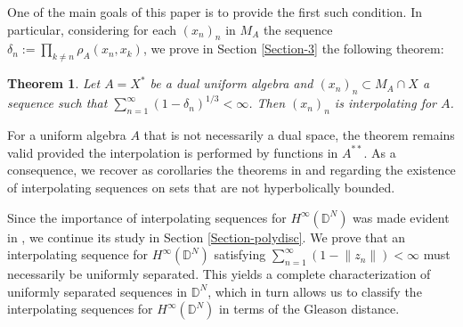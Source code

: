 \documentclass[preprint,12pt,number]{elsarticle}
\newtheorem{theorem}{Theorem}[section]
\begin{document}
One of the main goals of this paper is to provide the first such condition. In particular, considering for each $(x_n)_n$ in $M_A$ the sequence $\delta_n:=\prod_{k\neq n}\rho_A(x_n,x_k)$, we prove in Section \ref{Section-3} the following theorem:

\begin{theorem}\label{Main Theorem}Let $A=X^*$ be a dual uniform algebra and $(x_n)_n\subset M_A\cap X$ a sequence such that $\sum_{n=1}^\infty(1-\delta_n)^{1/3}<\infty$. Then $(x_n)_n$ is interpolating for $A$.\end{theorem}For a uniform algebra $A$ that is not necessarily a dual space, the theorem remains valid provided the interpolation is performed by functions in $A^{**}$. As a consequence, we recover as corollaries the theorems in \cite{CarneColeGamelin1989} and \cite{GalindoGamelinLindstrom2004} regarding the existence of interpolating sequences on sets that are not hyperbolically bounded.

Since the importance of interpolating sequences for $H^\infty(\mathbb{D}^N)$ was made evident in \cite{BerndtssonChangLin1987}, we continue its study in Section \ref{Section-polydisc}. We prove that an interpolating sequence for $H^\infty(\mathbb{D}^N)$ satisfying $\sum_{n=1}^\infty(1-\lVert z_n\rVert)<\infty$ must necessarily be uniformly separated. This yields a complete characterization of uniformly separated sequences in $\mathbb{D}^N$, which in turn allows us to classify the interpolating sequences for $H^\infty(\mathbb{D}^N)$ in terms of the Gleason distance.
\end{document}
